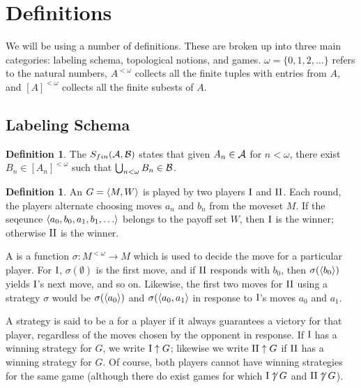 \documentclass{amsart}
\theoremstyle{plain}
\theoremstyle{definition}
\newtheorem{definition}[theorem]{Definition}
\theoremstyle{remark}
\theoremstyle{plain}
\theoremstyle{definition}
\theoremstyle{remark}
\begin{document}
\section{Definitions}

We will be using a number of definitions.
These are broken up into three main categories: labeling schema, topological notions, and games.
\(\omega=\{0,1,2,\dots\}\) refers to the natural numbers, 
\(A^{<\omega}\) collects all the finite tuples with entries from \(A\),
and \([A]^{<\omega}\) collects all the finite subests of \(A\).

\subsection{Labeling Schema}

\begin{definition}
 The  \(S_{fin}(\mathcal{A},\mathcal{B})\) states that given \(A_n\in\mathcal{A}\) for \(n<\omega\), there exist \(B_n\in[A_n]^{<\omega}\) such that \(\bigcup_{n<\omega}B_n\in\mathcal{B}\).
\end{definition}

\begin{definition}
 An  \(G=\langle M,W\rangle\) is played by two players \(\mathrm{I}\) and \(\mathrm{II}\).
 Each round, the players alternate choosing moves \(a_n\) and \(b_n\) from the moveset \(M\).
 If the seqeunce \(\<a_0,b_0,a_1,b_1,\dots\>\) belongs to the payoff set \(W\), then \(\mathrm{I}\)
 is the winner; otherwise \(\mathrm{II}\) is the winner.
 
 A  is a function \(\sigma:M^{<\omega}\to M\) which is used to decide the
 move for a particular player. For \(\mathrm{I}\), \(\sigma(\emptyset)\) is the first move,
 and if \(\mathrm{II}\) responds with \(b_0\), then \(\sigma(\langle b_0\rangle)\) yields \(\mathrm{I}\)'s next move,
 and so on. Likewise, the first two moves for \(\mathrm{II}\) using a strategy \(\sigma\)
 would be \(\sigma(\langle a_0\rangle)\) and \(\sigma(\langle a_0,a_1\rangle\) in response to \(\mathrm{I}\)'s moves
 \(a_0\) and \(a_1\).
 
 A strategy is said to be a  for a player if it always 
 guarantees a victory for that player, regardless of the moves chosen by the opponent in response.
 If \(\mathrm{I}\) has a winning strategy for \(G\), we write \(\mathrm{I}\uparrow G\); likewise we write
 \(\mathrm{II}\uparrow G\) if \(\mathrm{II}\) has a winning strategy for \(G\).
 Of course, both players cannot have winning strategies for the same game (although there
 do exist  games for which \(\mathrm{I}\not\uparrow G\) and \(\mathrm{II}\not\uparrow G\)).
\end{definition}
\end{document}
